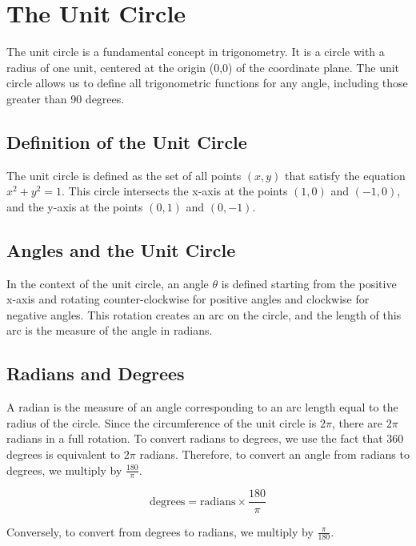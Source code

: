 \documentclass[a4paper,12pt]{book}
\begin{document}
\section{The Unit Circle}
\label{sec:unit_circle}

The unit circle is a fundamental concept in trigonometry. It is a circle with a radius of one unit, centered at the origin (0,0) of the coordinate plane. The unit circle allows us to define all trigonometric functions for any angle, including those greater than 90 degrees.

\subsection{Definition of the Unit Circle}
\label{subsec:unit_circle_definition}

The unit circle is defined as the set of all points \((x, y)\) that satisfy the equation \(x^2 + y^2 = 1\). This circle intersects the x-axis at the points \((1, 0)\) and \((-1, 0)\), and the y-axis at the points \((0, 1)\) and \((0, -1)\).

\subsection{Angles and the Unit Circle}
\label{subsec:angles_unit_circle}

In the context of the unit circle, an angle \(\theta\) is defined starting from the positive x-axis and rotating counter-clockwise for positive angles and clockwise for negative angles. This rotation creates an arc on the circle, and the length of this arc is the measure of the angle in radians.

\subsection{Radians and Degrees}
\label{subsec:radians_degrees}

A radian is the measure of an angle corresponding to an arc length equal to the radius of the circle. Since the circumference of the unit circle is \(2\pi\), there are \(2\pi\) radians in a full rotation. To convert radians to degrees, we use the fact that \(360\) degrees is equivalent to \(2\pi\) radians. Therefore, to convert an angle from radians to degrees, we multiply by \(\frac{180}{\pi}\).

\[
\text{degrees} = \text{radians} \times \frac{180}{\pi}
\]

Conversely, to convert from degrees to radians, we multiply by \(\frac{\pi}{180}\).
\end{document}
